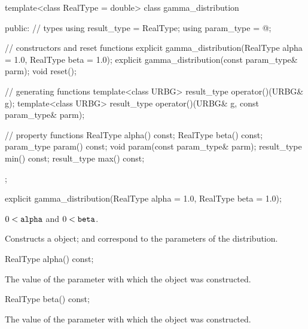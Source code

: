 %
\begin{codeblock}
template<class RealType = double>
  class gamma_distribution {
  public:
    // types
    using result_type = RealType;
    using param_type  = @\unspec@;

    // constructors and reset functions
    explicit gamma_distribution(RealType alpha = 1.0, RealType beta = 1.0);
    explicit gamma_distribution(const param_type& parm);
    void reset();

    // generating functions
    template<class URBG>
      result_type operator()(URBG& g);
    template<class URBG>
      result_type operator()(URBG& g, const param_type& parm);

    // property functions
    RealType alpha() const;
    RealType beta() const;
    param_type param() const;
    void param(const param_type& parm);
    result_type min() const;
    result_type max() const;
  };
\end{codeblock}


%
\begin{itemdecl}
explicit gamma_distribution(RealType alpha = 1.0, RealType beta = 1.0);
\end{itemdecl}

\begin{itemdescr}
\pnum
\requires $0 < \texttt{alpha}$ and $0 < \texttt{beta}$.

\pnum
\effects Constructs a  object;
 and 
correspond to the parameters of the distribution.
\end{itemdescr}

%
\begin{itemdecl}
RealType alpha() const;
\end{itemdecl}

\begin{itemdescr}
\pnum\returns The value of the  parameter
 with which the object was constructed.
\end{itemdescr}

%
\begin{itemdecl}
RealType beta() const;
\end{itemdecl}

\begin{itemdescr}
\pnum\returns The value of the  parameter
 with which the object was constructed.
\end{itemdescr}

